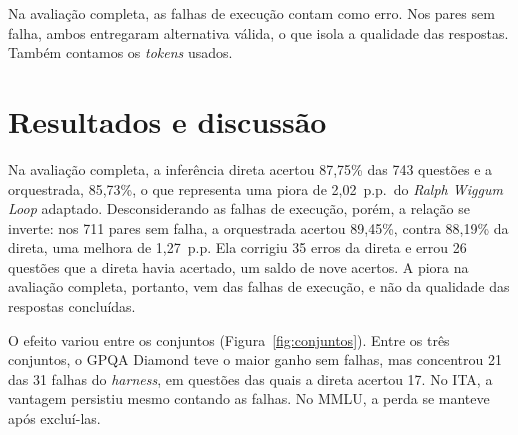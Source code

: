 \documentclass[a4paper,10pt, twocolumn]{article}
\begin{document}
Na avaliação completa, as falhas de execução contam como erro. Nos pares sem falha, ambos entregaram alternativa válida, o que isola a qualidade das respostas. Também contamos os \textit{tokens} usados.

\section{Resultados e discussão}

Na avaliação completa, a inferência direta acertou 87,75\% das 743 questões e a orquestrada, 85,73\%, o que representa uma piora de 2,02~p.p.\ do \textit{Ralph Wiggum Loop} adaptado. Desconsiderando as falhas de execução, porém, a relação se inverte: nos 711 pares sem falha, a orquestrada acertou 89,45\%, contra 88,19\% da direta, uma melhora de 1,27~p.p. Ela corrigiu 35 erros da direta e errou 26 questões que a direta havia acertado, um saldo de nove acertos. A piora na avaliação completa, portanto, vem das falhas de execução, e não da qualidade das respostas concluídas.

O efeito variou entre os conjuntos (Figura~\ref{fig:conjuntos}). Entre os três conjuntos, o GPQA Diamond teve o maior ganho sem falhas, mas concentrou 21 das 31 falhas do \textit{harness}, em questões das quais a direta acertou 17. No ITA, a vantagem persistiu mesmo contando as falhas. No MMLU, a perda se manteve após excluí-las.
\end{document}

